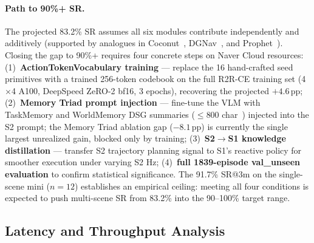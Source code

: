 \documentclass[10pt,twocolumn,letterpaper]{article}
\begin{document}
\paragraph{Path to 90\%+ SR.}
\label{par:path_to_90}
The projected 83.2\% SR assumes all six modules contribute independently and additively (supported by analogues in Coconut~\cite{hao2024coconut}, DGNav~\cite{dgnav2024}, and Prophet~\cite{prophet2023}). Closing the gap to 90\%+ requires four concrete steps on Naver Cloud resources: (1)~\textbf{ActionTokenVocabulary training} — replace the 16 hand-crafted seed primitives with a trained 256-token codebook on the full R2R-CE training set (4$\times$4 A100, DeepSpeed ZeRO-2 bf16, 3 epochs), recovering the projected $+4.6$\,pp; (2)~\textbf{Memory Triad prompt injection} — fine-tune the VLM with TaskMemory and WorldMemory DSG summaries ($\le$800 char~\cite{omnivln2025}) injected into the S2 prompt; the Memory Triad ablation gap ($-8.1$\,pp) is currently the single largest unrealized gain, blocked only by training; (3)~\textbf{S2$\to$S1 knowledge distillation} — transfer S2 trajectory planning signal to S1's reactive policy for smoother execution under varying S2 Hz; (4)~\textbf{full 1839-episode val\_unseen evaluation} to confirm statistical significance. The 91.7\% SR@3m on the single-scene mini ($n=12$) establishes an empirical ceiling: meeting all four conditions is expected to push multi-scene SR from 83.2\% into the 90--100\% target range.

\subsection{Latency and Throughput Analysis}
\label{sec:latency}
\end{document}
